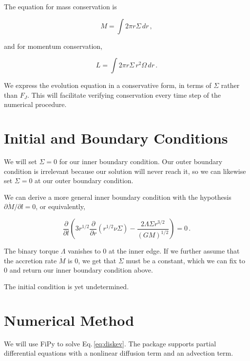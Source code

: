\documentclass{article}
\begin{document}
The equation for mass conservation is

\begin{equation}
M = \int 2\pi r \Sigma\, dr\,,
\end{equation}

and for momentum conservation,

\begin{equation}
\textit{L} = \int2\pi r \Sigma\, r^2 \Omega\, dr\,.
\end{equation}

We express the evolution equation in a conservative form, in terms of $\Sigma$ rather than $F_J$. This will facilitate verifying conservation every time step of the numerical procedure.

\section{Initial and Boundary Conditions}

We will set $\Sigma = 0$ for our inner boundary condition. Our outer boundary condition is irrelevant because our solution will never reach it, so we can likewise set $\Sigma = 0$ at our outer boundary condition. 

We can derive a more general inner boundary condition with the hypothesis $\partial \dot{M}/ \partial l = 0$, or equivalently,

\begin{equation}
\frac{\partial}{\partial l} \left(3 r^{1/2} \frac{\partial}{\partial r} \left(r^{1/2} \nu \Sigma\right) - \frac{2 \Lambda \Sigma r^{3/2}}{(G M)^{1/2}}\right)= 0\,.
\end{equation}

The binary torque $\Lambda$ vanishes to 0 at the inner edge. If we further assume that the accretion rate $\dot{M}$ is 0, we get that $\Sigma$ must be a constant, which we can fix to 0 and return our inner boundary condition above.

The initial condition is yet undetermined.

\section{Numerical Method}

We will use FiPy to solve Eq.\,\ref{eq:diskev}. The package supports partial differential equations with a nonlinear diffusion term and an advection term.
\end{document}
